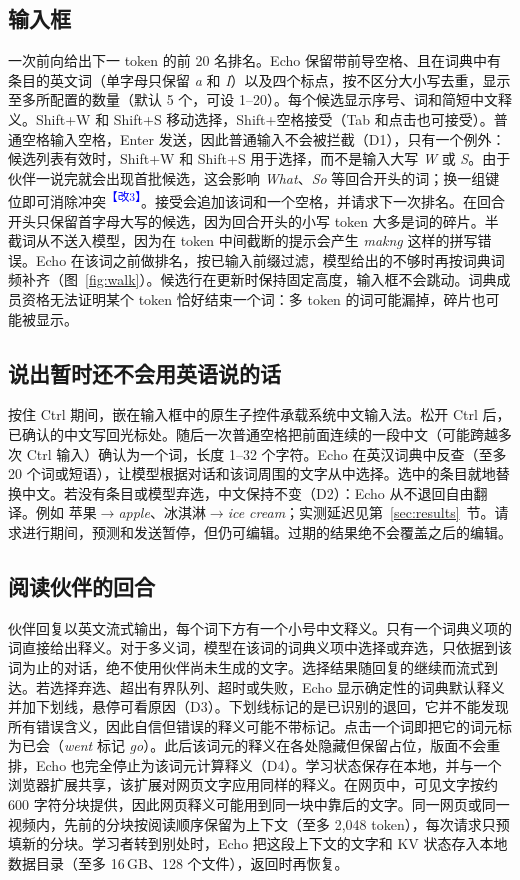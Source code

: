 \documentclass[11pt,a4paper,fontset=windows]{ctexart}
\newcommand{\audit}[1]{\textcolor{blue}{\textsuperscript{【改#1】}}}
\begin{document}
\subsection{输入框}
一次前向给出下一 token 的前 20 名排名。Echo 保留带前导空格、且在词典中有条目的英文词（单字母只保留 \emph{a} 和 \emph{I}）以及四个标点，按不区分大小写去重，显示至多所配置的数量（默认 5 个，可设 1--20）。每个候选显示序号、词和简短中文释义。Shift+W 和 Shift+S 移动选择，Shift+空格接受（Tab 和点击也可接受）。普通空格输入空格，Enter 发送，因此普通输入不会被拦截（D1），只有一个例外：候选列表有效时，Shift+W 和 Shift+S 用于选择，而不是输入大写 \emph{W} 或 \emph{S}。由于伙伴一说完就会出现首批候选，这会影响 \emph{What}、\emph{So} 等回合开头的词；换一组键位即可消除冲突\audit{3}。接受会追加该词和一个空格，并请求下一次排名。在回合开头只保留首字母大写的候选，因为回合开头的小写 token 大多是词的碎片。半截词从不送入模型，因为在 token 中间截断的提示会产生 \emph{makng} 这样的拼写错误。Echo 在该词之前做排名，按已输入前缀过滤，模型给出的不够时再按词典词频补齐（图~\ref{fig:walk}）。候选行在更新时保持固定高度，输入框不会跳动。词典成员资格无法证明某个 token 恰好结束一个词：多 token 的词可能漏掉，碎片也可能被显示。

\subsection{说出暂时还不会用英语说的话}
\label{sec:reverse}
按住 Ctrl 期间，嵌在输入框中的原生子控件承载系统中文输入法。松开 Ctrl 后，已确认的中文写回光标处。随后一次普通空格把前面连续的一段中文（可能跨越多次 Ctrl 输入）确认为一个词，长度 1--32 个字符。Echo 在英汉词典中反查（至多 20 个词或短语），让模型根据对话和该词周围的文字从中选择。选中的条目就地替换中文。若没有条目或模型弃选，中文保持不变（D2）：Echo 从不退回自由翻译。例如 苹果$\to$\emph{apple}、冰淇淋$\to$\emph{ice cream}；实测延迟见第~\ref{sec:results}~节。请求进行期间，预测和发送暂停，但仍可编辑。过期的结果绝不会覆盖之后的编辑。

\subsection{阅读伙伴的回合}
伙伴回复以英文流式输出，每个词下方有一个小号中文释义。只有一个词典义项的词直接给出释义。对于多义词，模型在该词的词典义项中选择或弃选，只依据到该词为止的对话，绝不使用伙伴尚未生成的文字。选择结果随回复的继续而流式到达。若选择弃选、超出有界队列、超时或失败，Echo 显示确定性的词典默认释义并加下划线，悬停可看原因（D3）。下划线标记的是已识别的退回，它并不能发现所有错误含义，因此自信但错误的释义可能不带标记。点击一个词即把它的词元标为已会（\emph{went} 标记 \emph{go}）。此后该词元的释义在各处隐藏但保留占位，版面不会重排，Echo 也完全停止为该词元计算释义（D4）。学习状态保存在本地，并与一个浏览器扩展共享，该扩展对网页文字应用同样的释义。在网页中，可见文字按约 600 字符分块提供，因此网页释义可能用到同一块中靠后的文字。同一网页或同一视频内，先前的分块按阅读顺序保留为上下文（至多 2,048 token），每次请求只预填新的分块。学习者转到别处时，Echo 把这段上下文的文字和 KV 状态存入本地数据目录（至多 16\,GB、128 个文件），返回时再恢复。
\end{document}
